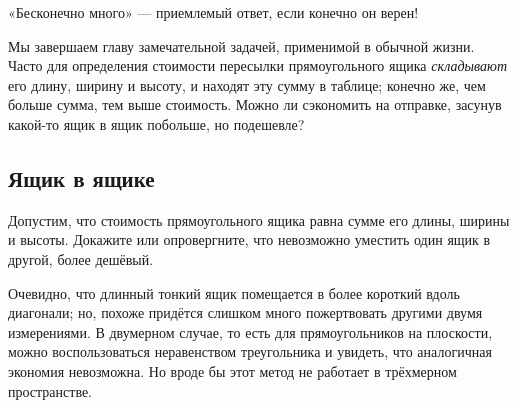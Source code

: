  «Бесконечно много» --- приемлемый ответ, если конечно он верен!

\medskip

Мы завершаем главу замечательной задачей, применимой в обычной жизни.
Часто для определения стоимости пересылки прямоугольного ящика \emph{складывают} его длину, ширину и высоту,
и находят эту сумму в таблице;
конечно же, чем больше сумма, тем выше стоимость.
Можно ли сэкономить на отправке, засунув какой-то ящик в ящик побольше, но подешевле?

\subsection*{Ящик в ящике}\label{Ящик в ящике}


Допустим, что стоимость прямоугольного ящика равна сумме его длины, ширины и высоты.
Докажите или опровергните, что невозможно уместить один ящик в другой, более дешёвый.

Очевидно, что длинный тонкий ящик помещается в более короткий вдоль диагонали;
но, похоже придётся слишком много пожертвовать другими двумя измерениями.
В двумерном случае, то есть для прямоугольников на плоскости, можно воспользоваться неравенством треугольника и увидеть, что аналогичная экономия невозможна.
Но вроде бы этот метод не работает в трёхмерном пространстве.
